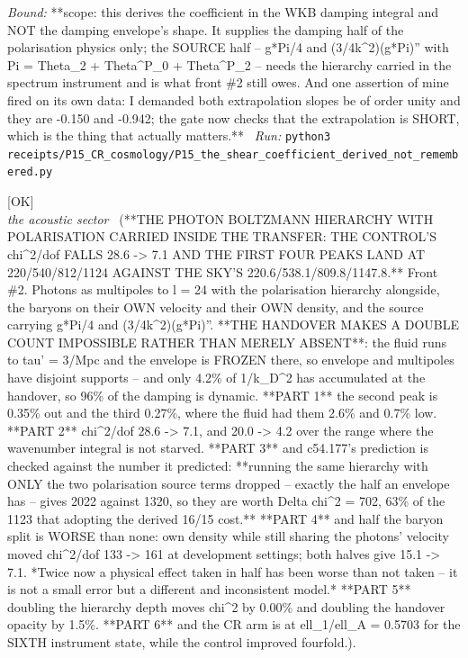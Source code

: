 \begin{description}
 \emph{Bound:} **scope: this derives the coefficient in the WKB damping integral and NOT the damping envelope's shape. It supplies the damping half of the polarisation physics only; the SOURCE half -- g*Pi/4 and (3/4k\textasciicircum{}2)(g*Pi)'' with Pi = Theta\_2 + Theta\textasciicircum{}P\_0 + Theta\textasciicircum{}P\_2 -- needs the hierarchy carried in the spectrum instrument and is what front \#2 still owes. And one assertion of mine fired on its own data: I demanded both extrapolation slopes be of order unity and they are -0.150 and -0.942; the gate now checks that the extrapolation is SHORT, which is the thing that actually matters.**
\ \emph{Run:} \texttt{python3 receipts/P15\_CR\_cosmology/P15\_the\_shear\_coefficient\_derived\_not\_remembered.py}
\item[\rcptlabel{P15_the_photon_hierarchy_in_the_transfer}{P15R72}\textbf{P15R72}\quad\texttt{P15\_the\_photon\_hierarchy\_in\_the\_transfer}]\hfill\textsf{[OK]}\\
\textit{the acoustic sector} \ (**THE PHOTON BOLTZMANN HIERARCHY WITH POLARISATION CARRIED INSIDE THE TRANSFER: THE CONTROL'S chi\textasciicircum{}2/dof FALLS 28.6 -> 7.1 AND THE FIRST FOUR PEAKS LAND AT 220/540/812/1124 AGAINST THE SKY'S 220.6/538.1/809.8/1147.8.** Front \#2. Photons as multipoles to l = 24 with the polarisation hierarchy alongside, the baryons on their OWN velocity and their OWN density, and the source carrying g*Pi/4 and (3/4k\textasciicircum{}2)(g*Pi)''. **THE HANDOVER MAKES A DOUBLE COUNT IMPOSSIBLE RATHER THAN MERELY ABSENT**: the fluid runs to tau' = 3/Mpc and the envelope is FROZEN there, so envelope and multipoles have disjoint supports -- and only 4.2\% of 1/k\_D\textasciicircum{}2 has accumulated at the handover, so 96\% of the damping is dynamic. **PART 1** the second peak is 0.35\% out and the third 0.27\%, where the fluid had them 2.6\% and 0.7\% low. **PART 2** chi\textasciicircum{}2/dof 28.6 -> 7.1, and 20.0 -> 4.2 over the range where the wavenumber integral is not starved. **PART 3** and c54.177's prediction is checked against the number it predicted: **running the same hierarchy with ONLY the two polarisation source terms dropped -- exactly the half an envelope has -- gives 2022 against 1320, so they are worth Delta chi\textasciicircum{}2 = 702, 63\% of the 1123 that adopting the derived 16/15 cost.** **PART 4** and half the baryon split is WORSE than none: own density while still sharing the photons' velocity moved chi\textasciicircum{}2/dof 133 -> 161 at development settings; both halves give 15.1 -> 7.1. *Twice now a physical effect taken in half has been worse than not taken -- it is not a small error but a different and inconsistent model.* **PART 5** doubling the hierarchy depth moves chi\textasciicircum{}2 by 0.00\% and doubling the handover opacity by 1.5\%. **PART 6** and the CR arm is at ell\_1/ell\_A = 0.5703 for the SIXTH instrument state, while the control improved fourfold.). 

\end{description}
